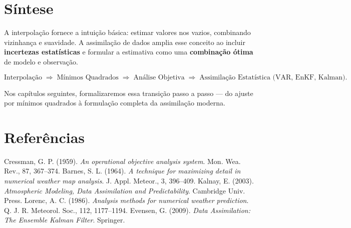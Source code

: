 \section{Síntese}

A interpolação fornece a intuição básica: estimar valores nos vazios, combinando vizinhança e suavidade.  
A assimilação de dados amplia esse conceito ao incluir \textbf{incertezas estatísticas} e formular a estimativa como uma \textbf{combinação ótima} de modelo e observação.

\begin{equation}
\text{Interpolação} 
\;\Rightarrow\;
\text{Mínimos Quadrados} 
\;\Rightarrow\;
\text{Análise Objetiva} 
\;\Rightarrow\;
\text{Assimilação Estatística (VAR, EnKF, Kalman)}.
\end{equation}

Nos capítulos seguintes, formalizaremos essa transição passo a passo --- do ajuste por mínimos quadrados à formulação completa da assimilação moderna.

\section*{Referências}

\begin{thebibliography}{99}
 Cressman, G. P. (1959). \textit{An operational objective analysis system}. Mon. Wea. Rev., 87, 367--374.
 Barnes, S. L. (1964). \textit{A technique for maximizing detail in numerical weather map analysis}. J. Appl. Meteor., 3, 396--409.
 Kalnay, E. (2003). \textit{Atmospheric Modeling, Data Assimilation and Predictability}. Cambridge Univ. Press.
 Lorenc, A. C. (1986). \textit{Analysis methods for numerical weather prediction}. Q. J. R. Meteorol. Soc., 112, 1177--1194.
 Evensen, G. (2009). \textit{Data Assimilation: The Ensemble Kalman Filter}. Springer.
\end{thebibliography}
